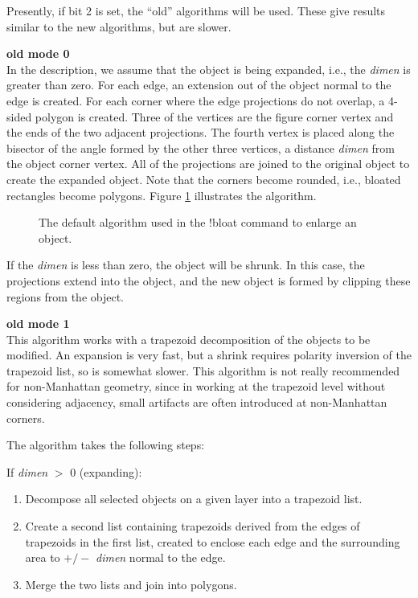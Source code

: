 Presently, if bit 2 is set, the ``old'' algorithms will be used. 
These give results similar to the new algorithms, but are slower.

\begin{description}
\item{\bf old mode 0}\\
In the description, we assume that the object is being expanded, i.e.,
the {\it dimen} is greater than zero.  For each edge, an extension out
of the object normal to the edge is created.  For each corner where
the edge projections do not overlap, a 4-sided polygon is created. 
Three of the vertices are the figure corner vertex and the ends of the
two adjacent projections.  The fourth vertex is placed along the
bisector of the angle formed by the other three vertices, a distance
{\it dimen} from the object corner vertex.  All of the projections are
joined to the original object to create the expanded object.  Note
that the corners become rounded, i.e., bloated rectangles become
polygons.  Figure \ref{bloatfig} illustrates the algorithm.

\begin{figure}
\caption{\label{bloatfig} The default algorithm used in the {\cb !bloat}
command to enlarge an object.}
\vspace{1.5ex}
\begin{center}
\end{center}
\end{figure}

If the {\it dimen} is less than zero, the object will be shrunk.  In
this case, the projections extend into the object, and the new object
is formed by clipping these regions from the object.

\item{\bf old mode 1}\\
This algorithm works with a trapezoid decomposition of the objects to
be modified.  An expansion is very fast, but a shrink requires
polarity inversion of the trapezoid list, so is somewhat slower.  This
algorithm is not really recommended for non-Manhattan geometry, since
in working at the trapezoid level without considering adjacency, small
artifacts are often introduced at non-Manhattan corners.

The algorithm takes the following steps:
\begin{description}
\item{If {\it dimen} $>$ 0 (expanding):}\\
\begin{enumerate}
\item{Decompose all selected objects on a given layer into a
trapezoid list.}
\item{Create a second list containing trapezoids derived from the
edges of trapezoids in the first list, created to enclose each edge
and the surrounding area to $+/-$ {\it dimen} normal to the edge.}
\item{Merge the two lists and join into polygons.}
\end{enumerate}


\end{description}
\end{description}
